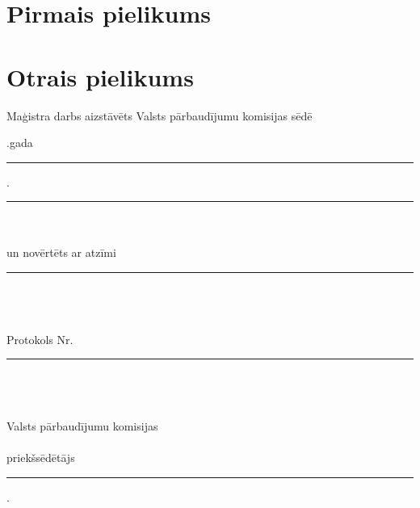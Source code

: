 \documentclass[12pt,paper=a4]{report}
\newcounter{nofappendices}
\begin{document}
\appendix
\chapter{Pirmais pielikums}

\addtocounter{nofappendices}{1}
\label{appendix:tituldati}
%


\chapter{Otrais pielikums}

\addtocounter{nofappendices}{1}
\label{appendix:tituldati2}


\pagebreak
\pagestyle{empty}
\begin{center}
 Maģistra darbs aizstāvēts Valsts pārbaudījumu komisijas sēdē\\
 \vspace{1em}
\end{center}
.gada \rule{1cm}{0.2pt} . \rule{3cm}{0.2pt}\\\\
un novērtēts ar atzīmi \rule{4cm}{0.2pt} \\\\\\
Protokols Nr. \rule{1cm}{0.2pt}\\\\\\
Valsts pārbaudījumu komisijas \\\\
priekšsēdētājs \rule{7cm}{0.2pt}.\\
\hspace*{5cm}\textit{\raisebox{1em}{paraksts}}
\end{document}
